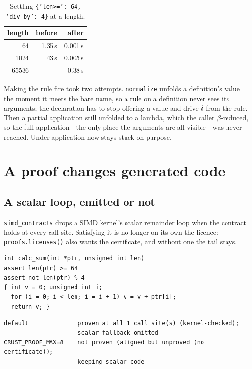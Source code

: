 \documentclass[11pt]{article}
\newcommand{\code}[1]{\texttt{#1}}
\begin{document}
\begin{table}[h]
\centering
\small
\begin{tabular}{rrr}
\toprule
length & before & after \\
\midrule
64 & 1.35\,s & 0.001\,s \\
1024 & 43\,s & 0.005\,s \\
65536 & --- & 0.38\,s \\
\bottomrule
\end{tabular}
\caption{Settling \code{\{'len>=': 64, 'div-by': 4\}} at a length.}
\label{tab:literals}
\end{table}

Making the rule fire took two attempts. \code{normalize} unfolds a
definition's value the moment it meets the bare name, so a rule on a
definition never sees its arguments; the declaration has to stop offering a
value and drive $\delta$ from the rule. Then a partial application still
unfolded to a lambda, which the caller $\beta$-reduced, so the full
application---the only place the arguments are all visible---was never
reached. Under-application now stays stuck on purpose.

\section{A proof changes generated code}
\label{sec:codegen}

\subsection{A scalar loop, emitted or not}

\code{simd\_contracts} drops a SIMD kernel's scalar remainder loop when the
contract holds at every call site. Satisfying it is no longer on its own the
licence: \code{proofs.licenses()} also wants the certificate, and without one
the tail stays.

\begin{lstlisting}[language=crustc]
int calc_sum(int *ptr, unsigned int len)
assert len(ptr) >= 64
assert not len(ptr) % 4
{ int v = 0; unsigned int i;
  for (i = 0; i < len; i = i + 1) v = v + ptr[i];
  return v; }
\end{lstlisting}

\begin{lstlisting}[language={}]
default              proven at all 1 call site(s) (kernel-checked);
                     scalar fallback omitted
CRUST_PROOF_MAX=8    not proven (aligned but unproved (no certificate));
                     keeping scalar code
\end{lstlisting}
\end{document}
